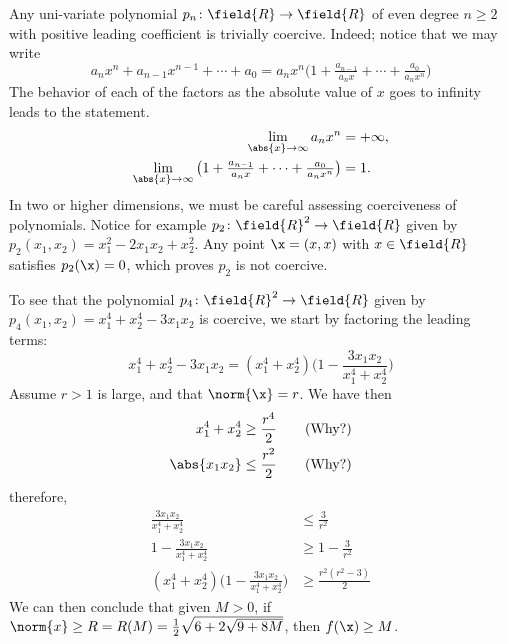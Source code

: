 \begin{example}\label{example:CoerciveFunctions}
Any uni-variate polynomial $p_n \colon \field{R} \to \field{R}$ of even degree $n \geq 2$ with positive leading coefficient is trivially coercive.  Indeed; notice that we may write
\begin{equation*}
a_n x^n + a_{n-1} x^{n-1} + \dotsb + a_0 = a_n x^n \big( 1 + \tfrac{a_{n-1}}{a_n x} + \dotsb + \tfrac{a_0}{a_n x^n} \big)
\end{equation*}
The behavior of each of the factors as the absolute value of $x$ goes to infinity leads to the statement.
\begin{align*}
\lim_{\abs{x} \to \infty} a_n x^n &= +\infty, \\
\lim_{\abs{x} \to \infty} \big( 1 + \tfrac{a_{n-1}}{a_n x} + \dotsb + \tfrac{a_0}{a_n x^n} \big) &= 1.
\end{align*}
In two or higher dimensions, we must be careful assessing coerciveness of polynomials. Notice for example $p_2 \colon \field{R}^2 \to \field{R}$ given by $p_2(x_1,x_2) = x_1^2 - 2x_1x_2 + x_2^2$.  Any point $\x = (x,x)$ with $x \in \field{R}$ satisfies $p_2(\x)=0$, which proves $p_2$ is not coercive.

To see that the polynomial $p_4 \colon \field{R}^2 \to \field{R}$ given by $p_4(x_1, x_2) = x_1^4 + x_2^4 - 3x_1x_2$ is coercive, we start by factoring the leading terms:
\begin{equation*}
x_1^4 + x_2^4 - 3x_1x_2 = (x_1^4 + x_2^4) \bigg( 1 - \frac{3x_1x_2}{x_1^4 + x_2^4} \bigg)
\end{equation*}
Assume $r>1$ is large, and that $\norm{\x} = r$.  We have then
\begin{align*}
x_1^4 + x_2^4 &\geq \frac{r^4}{2} \qquad\text{(Why?)} \\
 \abs{x_1 x_2} &\leq \frac{r^2}{2} \qquad\text{(Why?)}
\end{align*}
therefore, 
\begin{align*}
\frac{3x_1x_2}{x_1^4 + x_2^4} &\leq \frac{3}{r^2} \\
1 - \frac{3x_1x_2}{x_1^4 + x_2^4} &\geq 1 - \frac{3}{r^2} \\
(x_1^4 + x_2^4) \bigg( 1 - \frac{3x_1 x_2}{x_1^4 + x_2^4} \bigg) &\geq \frac{r^2(r^2-3)}{2}
\end{align*} 
We can then conclude that given $M>0$, if $\norm{x} \geq R = R(M) = \tfrac{1}{2}\sqrt{6+2\sqrt{9+8M}}$, then $f(\x) \geq M$.
\end{example}

